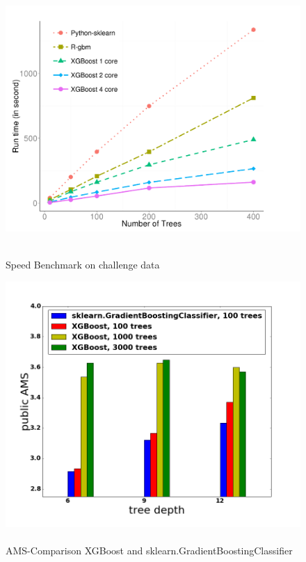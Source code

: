 \begin{figure}[h]
\centering
\begin{minipage}{0.48\textwidth}
  \centering
  \includegraphics[width=\linewidth]{images/xgboost-speed}
  \vspace{-0.1ex}
	\caption{\\Speed Benchmark on challenge data \cite{chen14}}
	\label{fig:xgb-speed}
\end{minipage}
\quad
\begin{minipage}{0.48\textwidth}
  \centering
  \includegraphics[width=\linewidth]{images/xgb-gbc}
	\caption{\\AMS-Comparison XGBoost and sklearn.GradientBoostingClassifier}
	\label{fig:xgb-gbc}
\end{minipage}
\end{figure}

